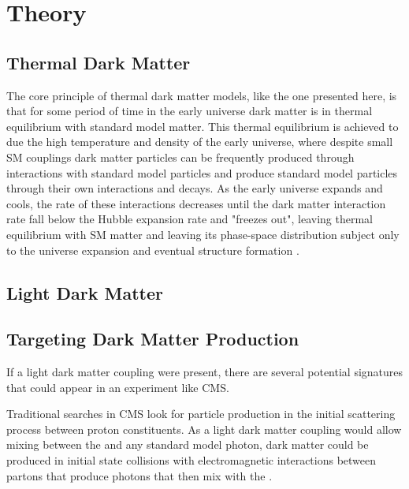 \chapter{Theory}
\label{theory}
\section{Thermal Dark Matter}
The core principle of thermal dark matter models, like the one presented here, is that for some period of time in the early universe dark matter is in thermal equilibrium with standard model matter.
This thermal equilibrium is achieved to due the high temperature and density of the early universe, where despite small SM couplings dark matter particles can be frequently produced through interactions with standard model particles and produce standard model particles through their own interactions and decays.
As the early universe expands and cools, the rate of these interactions decreases until the dark matter interaction rate fall below the Hubble expansion rate and "freezes out", leaving thermal equilibrium with SM matter and leaving its phase-space distribution subject only to the universe expansion and eventual structure formation \cite{ref:thermalDM}.


\section{Light Dark Matter}

\section{Targeting Dark Matter Production}
If a light dark matter coupling were present, there are several potential signatures that could appear in an experiment like CMS.

Traditional searches in CMS look for particle production in the initial scattering process between proton constituents.
As a light dark matter coupling would allow mixing between the \aprime and any standard model photon, dark matter could be produced in initial state collisions with electromagnetic interactions between partons that produce photons that then mix with the \aprime.

